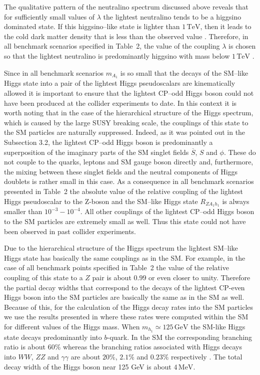 \documentclass[12pt,a4paper]{article}
\begin{document}
The qualitative pattern of the neutralino spectrum discussed above reveals that for sufficiently small values
of $\lambda$ the lightest neutralino tends to be a higgsino dominated state. If this higgsino--like state is lighter than $1\,\mbox{TeV}$,
then it leads to the cold dark matter density that is less than the observed value \cite{ArkaniHamed:2006mb}.
Therefore, in all benchmark scenarios specified in Table~2, the value of the coupling 
$\lambda$ is chosen so that the lightest
neutralino is predominantly higgsino with mass below $1\,\mbox{TeV}$ .

Since in all benchmark scenarios $m_{A_1}$ is so small that the decays of the SM--like Higgs state into a pair of the lightest Higgs
pseudoscalars are kinematically allowed it is important to ensure that the lightest CP--odd Higgs boson could not have been produced
at the collider experiments to date. In this context it is worth noting that in the case of the hierarchical structure of the Higgs spectrum,
which is caused by the large SUSY breaking scale, the couplings of this state to the SM particles are naturally suppressed. Indeed,
as it was pointed out in the Subsection 3.2, the lightest CP--odd Higgs boson is predominantly a superposition of the imaginary parts
of the SM singlet fields $\overline{S}$, $S$ and $\phi$. These do not couple to the quarks, leptons and SM gauge boson directly and, furthermore,
the mixing between these singlet fields and the neutral components of Higgs doublets is rather small in this case. As a consequence
in all benchmark scenarios presented in Table~2 the absolute value of the relative coupling of the lightest Higgs pseudoscalar to
the Z-boson and the SM--like Higgs state $R_{Z A_1 h_1}$ is always smaller than $10^{-3}-10^{-4}$. All other couplings of
the lightest CP--odd Higgs boson to the SM particles are extremely small as well. Thus this state could not have been observed in past collider experiments.

Due to the hierarchical structure of the Higgs spectrum the lightest SM--like Higgs state has basically the same couplings as in the SM.
For example, in the case of all benchmark points specified in Table~2 the value of the relative coupling of this state to a $Z$ pair
is about $0.99$ or even closer to unity. Therefore the partial decay widths that correspond to the decays of the lightest CP-even
Higgs boson into the SM particles are basically the same as in the SM as well. Because of this, for the calculation of the Higgs decay
rates into the SM particles we use the results presented in \cite{King:2012is} where these rates were computed within the SM for
different values of the Higgs mass. When $m_{h_1}\simeq 125\,\mbox{GeV}$ the SM-like Higgs state decays predominantly
into $b$-quark. In the SM the corresponding branching ratio is about $60\%$ whereas the branching ratios associated with
Higgs decays into $WW$, $ZZ$ and $\gamma\gamma$ are about $20\%$, $2.1\%$ and $0.23\%$ respectively \cite{King:2012is}.
The total decay width of the Higgs boson near 125 GeV is about $4\,\mbox{MeV}$.
\end{document}
